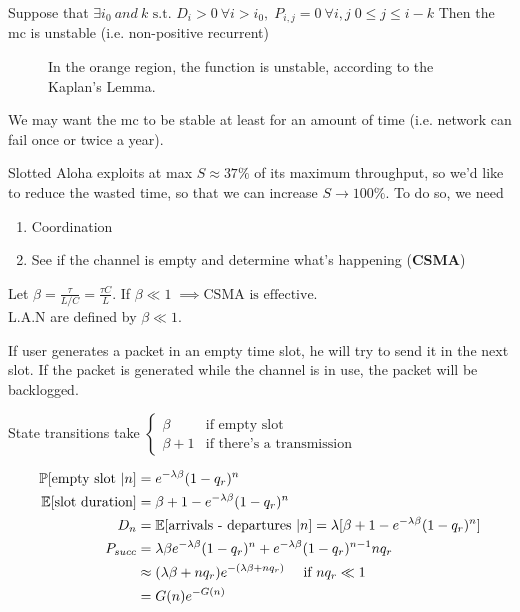 \begin{lemma}
Suppose that $\exists i_0 ~and ~k \text{ s.t. } D_i>0 ~\forall i> i_0 , \; P_{i,j} = 0 ~\forall i,j \; 0 \le j \le i-k$
Then the \gls{mc} is unstable (i.e. non-positive recurrent)

\begin{figure}
	\centering
	
	\caption{In the orange region, the function is unstable, according to the Kaplan's Lemma.}
	\label{fig:kaplan}
\end{figure}

We may want the \gls{mc} to be stable at least for an amount of time (i.e. network can fail once or twice a year).
\end{lemma}

Slotted Aloha exploits at max $S \approx 37 \%$ of its maximum throughput, so we'd like to reduce the wasted time,
so that we can increase $S \to 100\%$. To do so, we need
\begin{enumerate}
	\item Coordination
	\item See if the channel is empty and determine what's happening (\textbf{CSMA})
\end{enumerate}

Let $\beta = \frac{\tau}{L/C} = \frac{\tau C}{L}$. If $\beta \ll 1 \; \implies \text{CSMA is effective}$. \\
L.A.N are defined by $\beta \ll 1$.

If user generates a packet in an empty time slot, he will try to send it in the next slot. If the packet is generated while the channel is in use, the packet will be backlogged.

State transitions take $\begin{cases}
	\beta & \text{if empty slot} \\
	\beta + 1 & \text{if there's a transmission}
\end{cases}$

\begin{equation}\begin{split}
	\mathbb{P}[\text{empty slot }|n] &= e^{-\lambda \beta} (1-q_r)^n \\
	\mathbb{E}[\text{slot duration}] &= \beta + 1 - e^{-\lambda\beta} (1-q_r)^n \\
	D_n &= \mathbb{E}[\text{arrivals - departures }|n ]= \lambda [\beta + 1 - e^{-\lambda \beta} (1-q_r)^n ]\\
	P_{succ} &= \lambda \beta e^{-\lambda \beta} (1-q_r)^n + e^{-\lambda \beta} (1-q_r)^{n-1} n q_r \\
	&\approx (\lambda \beta + n q_r) e^{-(\lambda \beta + n q_r)} \quad \text{ if } n q_r \ll 1 \\
	&= G(n) e^{-G(n)}
\end{split}\end{equation}

